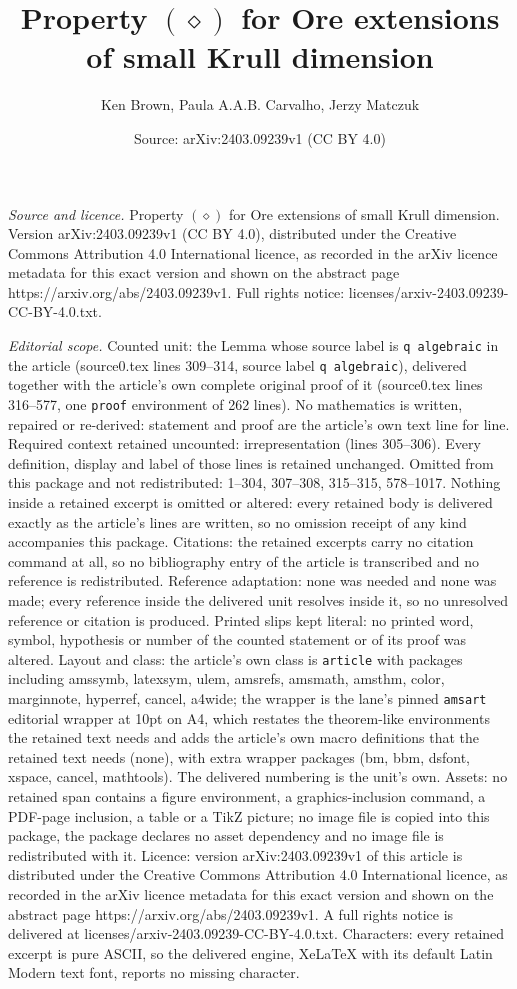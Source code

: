 \documentclass[10pt,a4paper]{amsart}
\title[Property $(\diamond)$ for Ore extensions of small Krull dime]{Property $(\diamond)$ for Ore extensions of small Krull dimension}
\author{Ken Brown, Paula A.A.B. Carvalho, Jerzy Matczuk}
\date{Source: arXiv:2403.09239v1 (CC BY 4.0)}
\begin{document}
\maketitle

\noindent\emph{Source and licence.} Property $(\diamond)$ for Ore extensions of small Krull dimension. Version arXiv:2403.09239v1 (CC BY 4.0), distributed under the Creative Commons Attribution 4.0 International licence, as recorded in the arXiv licence metadata for this exact version and shown on the abstract page https://arxiv.org/abs/2403.09239v1. Full rights notice: licenses/arxiv-2403.09239-CC-BY-4.0.txt.\par\smallskip

\noindent\textit{Editorial scope.} Counted unit: the Lemma whose source label is \texttt{q algebraic} in the article (source0.tex lines 309--314, source label \texttt{q algebraic}), delivered together with the article's own complete original proof of it (source0.tex lines 316--577, one \texttt{proof} environment of 262 lines). No mathematics is written, repaired or re-derived: statement and proof are the article's own text line for line. Required context retained uncounted: irrepresentation (lines 305--306). Every definition, display and label of those lines is retained unchanged. Omitted from this package and not redistributed: 1--304, 307--308, 315--315, 578--1017. Nothing inside a retained excerpt is omitted or altered: every retained body is delivered exactly as the article's lines are written, so no omission receipt of any kind accompanies this package. Citations: the retained excerpts carry no citation command at all, so no bibliography entry of the article is transcribed and no reference is redistributed. Reference adaptation: none was needed and none was made; every reference inside the delivered unit resolves inside it, so no unresolved reference or citation is produced. Printed slips kept literal: no printed word, symbol, hypothesis or number of the counted statement or of its proof was altered. Layout and class: the article's own class is \texttt{article} with packages including amssymb, latexsym, ulem, amsrefs, amsmath, amsthm, color, marginnote, hyperref, cancel, a4wide; the wrapper is the lane's pinned \texttt{amsart} editorial wrapper at 10pt on A4, which restates the theorem-like environments the retained text needs and adds the article's own macro definitions that the retained text needs (none), with extra wrapper packages (bm, bbm, dsfont, xspace, cancel, mathtools). The delivered numbering is the unit's own. Assets: no retained span contains a figure environment, a graphics-inclusion command, a PDF-page inclusion, a table or a TikZ picture; no image file is copied into this package, the package declares no asset dependency and no image file is redistributed with it. Licence: version arXiv:2403.09239v1 of this article is distributed under the Creative Commons Attribution 4.0 International licence, as recorded in the arXiv licence metadata for this exact version and shown on the abstract page https://arxiv.org/abs/2403.09239v1. A full rights notice is delivered at licenses/arxiv-2403.09239-CC-BY-4.0.txt. Characters: every retained excerpt is pure ASCII, so the delivered engine, XeLaTeX with its default Latin Modern text font, reports no missing character.
\end{document}
